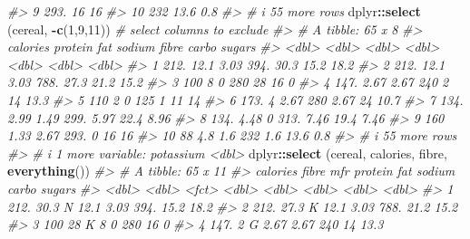 \documentclass[
]{book}
\newenvironment{Shaded}{\begin{snugshade}}{\end{snugshade}}
\newcommand{\CommentTok}[1]{\textcolor[rgb]{0.56,0.35,0.01}{\textit{#1}}}
\newcommand{\DecValTok}[1]{\textcolor[rgb]{0.00,0.00,0.81}{#1}}
\newcommand{\FunctionTok}[1]{\textcolor[rgb]{0.13,0.29,0.53}{\textbf{#1}}}
\newcommand{\NormalTok}[1]{#1}
\newcommand{\SpecialCharTok}[1]{\textcolor[rgb]{0.81,0.36,0.00}{\textbf{#1}}}
\begin{document}
\begin{Shaded}
\begin{Highlighting}[]
\CommentTok{\#\textgreater{}  9   293.  16    16   }
\CommentTok{\#\textgreater{} 10   232   13.6   0.8 }
\CommentTok{\#\textgreater{} \# i 55 more rows}
\NormalTok{dplyr}\SpecialCharTok{::}\FunctionTok{select}\NormalTok{ (cereal, }\SpecialCharTok{{-}}\FunctionTok{c}\NormalTok{(}\DecValTok{1}\NormalTok{,}\DecValTok{9}\NormalTok{,}\DecValTok{11}\NormalTok{))      }\CommentTok{\# select columns to exclude}
\CommentTok{\#\textgreater{} \# A tibble: 65 x 8}
\CommentTok{\#\textgreater{}    calories protein   fat sodium fibre carbo sugars}
\CommentTok{\#\textgreater{}       \textless{}dbl\textgreater{}   \textless{}dbl\textgreater{} \textless{}dbl\textgreater{}  \textless{}dbl\textgreater{} \textless{}dbl\textgreater{} \textless{}dbl\textgreater{}  \textless{}dbl\textgreater{}}
\CommentTok{\#\textgreater{}  1     212.   12.1   3.03   394. 30.3   15.2  18.2 }
\CommentTok{\#\textgreater{}  2     212.   12.1   3.03   788. 27.3   21.2  15.2 }
\CommentTok{\#\textgreater{}  3     100     8     0      280  28     16     0   }
\CommentTok{\#\textgreater{}  4     147.    2.67  2.67   240   2     14    13.3 }
\CommentTok{\#\textgreater{}  5     110     2     0      125   1     11    14   }
\CommentTok{\#\textgreater{}  6     173.    4     2.67   280   2.67  24    10.7 }
\CommentTok{\#\textgreater{}  7     134.    2.99  1.49   299.  5.97  22.4   8.96}
\CommentTok{\#\textgreater{}  8     134.    4.48  0      313.  7.46  19.4   7.46}
\CommentTok{\#\textgreater{}  9     160     1.33  2.67   293.  0     16    16   }
\CommentTok{\#\textgreater{} 10      88     4.8   1.6    232   1.6   13.6   0.8 }
\CommentTok{\#\textgreater{} \# i 55 more rows}
\CommentTok{\#\textgreater{} \# i 1 more variable: potassium \textless{}dbl\textgreater{}}
\NormalTok{dplyr}\SpecialCharTok{::}\FunctionTok{select}\NormalTok{ (cereal, calories, fibre, }\FunctionTok{everything}\NormalTok{()) }
\CommentTok{\#\textgreater{} \# A tibble: 65 x 11}
\CommentTok{\#\textgreater{}    calories fibre mfr   protein   fat sodium carbo sugars}
\CommentTok{\#\textgreater{}       \textless{}dbl\textgreater{} \textless{}dbl\textgreater{} \textless{}fct\textgreater{}   \textless{}dbl\textgreater{} \textless{}dbl\textgreater{}  \textless{}dbl\textgreater{} \textless{}dbl\textgreater{}  \textless{}dbl\textgreater{}}
\CommentTok{\#\textgreater{}  1     212. 30.3  N       12.1   3.03   394.  15.2  18.2 }
\CommentTok{\#\textgreater{}  2     212. 27.3  K       12.1   3.03   788.  21.2  15.2 }
\CommentTok{\#\textgreater{}  3     100  28    K        8     0      280   16     0   }
\CommentTok{\#\textgreater{}  4     147.  2    G        2.67  2.67   240   14    13.3 }

\end{Highlighting}
\end{Shaded}
\end{document}
